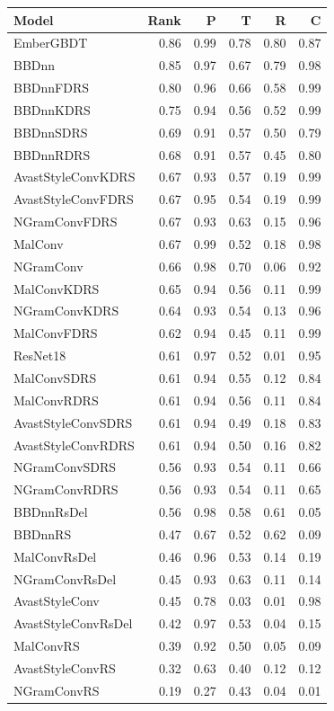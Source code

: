 \begin{tabular}{lrrrrr}
\toprule
Model & Rank & P & T & R & C \\
\midrule
EmberGBDT & 0.86 & 0.99 & 0.78 & 0.80 & 0.87 \\
BBDnn & 0.85 & 0.97 & 0.67 & 0.79 & 0.98 \\
BBDnnFDRS & 0.80 & 0.96 & 0.66 & 0.58 & 0.99 \\
BBDnnKDRS & 0.75 & 0.94 & 0.56 & 0.52 & 0.99 \\
BBDnnSDRS & 0.69 & 0.91 & 0.57 & 0.50 & 0.79 \\
BBDnnRDRS & 0.68 & 0.91 & 0.57 & 0.45 & 0.80 \\
AvastStyleConvKDRS & 0.67 & 0.93 & 0.57 & 0.19 & 0.99 \\
AvastStyleConvFDRS & 0.67 & 0.95 & 0.54 & 0.19 & 0.99 \\
NGramConvFDRS & 0.67 & 0.93 & 0.63 & 0.15 & 0.96 \\
MalConv & 0.67 & 0.99 & 0.52 & 0.18 & 0.98 \\
NGramConv & 0.66 & 0.98 & 0.70 & 0.06 & 0.92 \\
MalConvKDRS & 0.65 & 0.94 & 0.56 & 0.11 & 0.99 \\
NGramConvKDRS & 0.64 & 0.93 & 0.54 & 0.13 & 0.96 \\
MalConvFDRS & 0.62 & 0.94 & 0.45 & 0.11 & 0.99 \\
ResNet18 & 0.61 & 0.97 & 0.52 & 0.01 & 0.95 \\
MalConvSDRS & 0.61 & 0.94 & 0.55 & 0.12 & 0.84 \\
MalConvRDRS & 0.61 & 0.94 & 0.56 & 0.11 & 0.84 \\
AvastStyleConvSDRS & 0.61 & 0.94 & 0.49 & 0.18 & 0.83 \\
AvastStyleConvRDRS & 0.61 & 0.94 & 0.50 & 0.16 & 0.82 \\
NGramConvSDRS & 0.56 & 0.93 & 0.54 & 0.11 & 0.66 \\
NGramConvRDRS & 0.56 & 0.93 & 0.54 & 0.11 & 0.65 \\
BBDnnRsDel & 0.56 & 0.98 & 0.58 & 0.61 & 0.05 \\
BBDnnRS & 0.47 & 0.67 & 0.52 & 0.62 & 0.09 \\
MalConvRsDel & 0.46 & 0.96 & 0.53 & 0.14 & 0.19 \\
NGramConvRsDel & 0.45 & 0.93 & 0.63 & 0.11 & 0.14 \\
AvastStyleConv & 0.45 & 0.78 & 0.03 & 0.01 & 0.98 \\
AvastStyleConvRsDel & 0.42 & 0.97 & 0.53 & 0.04 & 0.15 \\
MalConvRS & 0.39 & 0.92 & 0.50 & 0.05 & 0.09 \\
AvastStyleConvRS & 0.32 & 0.63 & 0.40 & 0.12 & 0.12 \\
NGramConvRS & 0.19 & 0.27 & 0.43 & 0.04 & 0.01 \\
\bottomrule
\end{tabular}
